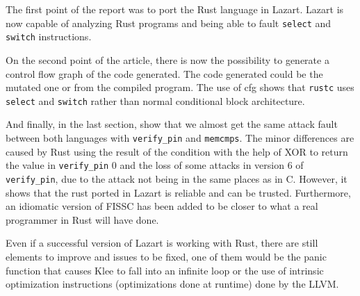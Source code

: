 \label{section:Conclusion}
The first point of the report was to port the Rust language in Lazart. Lazart is now capable of analyzing Rust programs and being able to fault \texttt{select} and \texttt{switch} instructions.

On the second point of the article, there is now the possibility to generate a control flow graph of the code generated. The code generated could be the mutated one or from the compiled program. The use of cfg shows that \texttt{rustc} uses \texttt{select} and \texttt{switch} rather than normal conditional block architecture.

And finally, in the last section, show that we almost get the same attack fault between both languages with \texttt{verify\_pin} and \texttt{memcmps}.
The minor differences are caused by Rust using the result of the condition with the help of XOR to return the value in \texttt{verify\_pin} 0 and the loss of some attacks in version 6 of \texttt{verify\_pin}, due to the attack not being in the same places as in C.
However, it shows that the rust ported in Lazart is reliable and can be trusted.
Furthermore, an idiomatic version of FISSC has been added to be closer to what a real programmer in Rust will have done.

Even if a successful version of Lazart is working with Rust, there are still elements to improve and issues to be fixed, one of them would be the panic function that causes Klee to fall into an infinite loop or the use of intrinsic optimization instructions (optimizations done at runtime) done by the LLVM.

